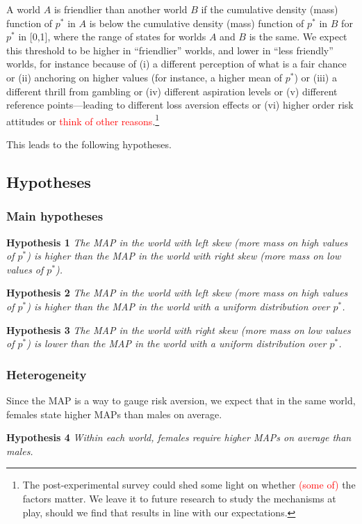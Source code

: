 A world $A$ is friendlier than another world $B$ if the cumulative density (mass) function of $p^*$ in $A$ is below the cumulative density (mass) function of $p^*$ in $B$ for $p^*$ in [0,1], where the range of states for worlds $A$ and $B$ is the same.
We expect this threshold to be higher in ``friendlier'' worlds, and lower in ``less friendly'' worlds, for instance because of (i) a different perception of what is a fair chance or (ii) anchoring on higher values (for instance, a higher mean of $p^*$) or (iii) a different thrill from gambling or (iv) different aspiration levels or (v) different reference points---leading to different loss aversion effects or (vi) higher order risk attitudes or \textcolor{red}{think of other reasons}.\footnote{
The post-experimental survey could shed some light on whether \textcolor{red}{(some of)} the factors matter.
We leave it to future research to study the mechanisms at play, should we find that results in line with our expectations.
}

This leads to the following hypotheses.

\subsection{Hypotheses}
\subsubsection{Main hypotheses}
\noindent \textbf{Hypothesis 1} \quad \textit{The MAP in the world with left skew (more mass on high values of $p^*$) is higher than the MAP in the world with right skew (more mass on low values of $p^*$).}

\noindent \textbf{Hypothesis 2} \quad \textit{The MAP in the world with left skew (more mass on high values of $p^*$) is higher than the MAP in the world with a uniform distribution over $p^*$.}

\noindent \textbf{Hypothesis 3} \quad \textit{The MAP in the world with right skew (more mass on low values of $p^*$) is lower than the MAP in the world with a uniform distribution over $p^*$.}

\subsubsection{Heterogeneity}
Since the MAP is a way to gauge risk aversion, we expect that in the same world, females state higher MAPs than males on average.

\noindent \textbf{Hypothesis 4} \quad \textit{Within each world, females require higher MAPs on average than males.}

